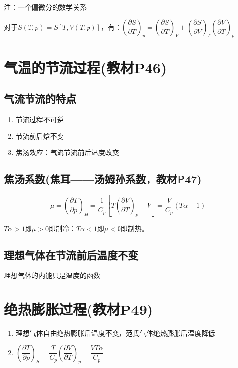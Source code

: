 \documentclass[oneside]{ctexbook}
\begin{document}
注：一个偏微分的数学关系

对于\(S(T,p)=S[T,V(T,p)]\)，有：\(\left(\dfrac{\partial{}S}{\partial{}T}\right)_p=\left(\dfrac{\partial{}S}{\partial{}T}\right)_V+\left(\dfrac{\partial{}S}{\partial{}V}\right)_T\left(\dfrac{\partial{}V}{\partial{}T}\right)_p\)

\section{气温的节流过程(教材P46)}

\subsection{气流节流的特点}
\begin{enumerate}
    \item 节流过程不可逆
    \item 节流前后焓不变
    \item 焦汤效应：气流节流前后温度改变
\end{enumerate}

\subsection{焦汤系数(焦耳——汤姆孙系数，教材P47)}
\begin{equation}
\mu=\left(\dfrac{\partial{}T}{\partial{}p}\right)_H=\dfrac{1}{C_p}\left[T\left(\dfrac{\partial{}V}{\partial{}T}\right)_p-V\right]=\dfrac{V}{C_p}(T\alpha-1)
\end{equation}

\(T\alpha>1\)即\(\mu>0\)即制冷：\(T\alpha<1\)即\(\mu<0\)即制热。

\subsection{理想气体在节流前后温度不变}

理想气体的内能只是温度的函数

\section{绝热膨胀过程(教材P49)}
\begin{enumerate}
    \item 理想气体自由绝热膨胀后温度不变，范氏气体绝热膨胀后温度降低
    \item \(\left(\dfrac{\partial{}T}{\partial{}p}\right)_S=\dfrac{T}{C_p}\left(\dfrac{\partial{}V}{\partial{}T}\right)_p=\dfrac{VT\alpha}{C_p}\)
\end{enumerate}
\end{document}
